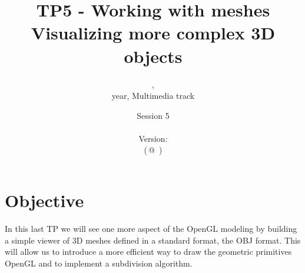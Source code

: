 \documentclass[a4paper,11pt]{article}
\title{\sf\bfseries TP5 - Working with meshes \\ {\small Visualizing more complex 3D objects}}
\author{\course, \ayear\\ \nth{2} year, Multimedia track}
\date{Session 5\\~\\{\small Version: \gitReln{} \\\vskip -2mm {\tiny (\gitBranch\,@\,\gitAbbrevHash{} \gitAuthorDate)}}}
\newcommand{\hilight}[1]{\colorbox{bg}{#1}}
\newcommand{\coden}[1]{\texttt{#1}}
\newcommand{\code}[1]{\hilight{\texttt{#1}}}
\newcommand{\brand}[1]{\textsf{#1}\xspace}
\newcommand{\opengl}{\brand{OpenGL}}
\newcommand{\GLUT}{\brand{GLUT}}
\newcommand{\glut}{\GLUT}
\newcommand{\obj}{\brand{OBJ}}
\begin{document}
\maketitle
\textsf{\tableofcontents}

\section{Objective}
In this last TP we will see one more aspect of the \opengl modeling by building a simple viewer of 3D meshes defined in a standard format, the \obj format. This will allow us to introduce a more efficient way to draw the geometric primitives \opengl and to implement a subdivision algorithm.






\end{document}
